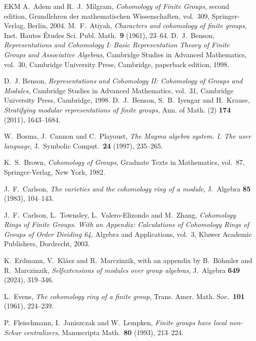 \documentclass[11pt,a4paper]{amsart}
\numberwithin{equation}{section}
\begin{document}
\begin{thebibliography}{EKM}
A.~Adem and R.~J.~Milgram,
{\emph{Cohomology of Finite Groups}},
second edition, Grundlehren der mathematischen Wissenschaften,
vol.~309, Springer-Verlag, Berlin, 2004.
M.~F.~Atiyah,
{\emph{Characters and cohomology of finite groups}},
Inst. Hautes \'Etudes Sci. Publ. Math.\ \textbf{9} (1961), 23--64.
D.~J.~Benson,
\emph{Representations and Cohomology I: Basic Representation Theory
of Finite Groups and Associative Algebras},
Cambridge Studies in Advanced Mathematics, vol.~30,
Cambridge University Press, Cambridge, paperback edition, 1998.

D.~J. Benson,
\emph{Representations and Cohomology II: Cohomology of Groups and Modules},
Cambridge Studies in Advanced Mathematics, vol.~31,
Cambridge University Press, Cambridge, 1998.
D.~J.~Benson, S.~B.~Iyengar and H.~Krause,
{\emph{Stratifying modular representations of finite groups}},
Ann. of Math. (2) \textbf{174} (2011), 1643--1684.

W.~Bosma, J.~Cannon and C.~Playoust,
\emph{The Magma algebra system. I. The user language},
J.~Symbolic Comput.\ \textbf{24} (1997), 235--265.

K.~S.~Brown,
{\emph{Cohomology of Groups}},
Graduate Texts in Mathematics, vol.~87,
Springer-Verlag, New York, 1982.

J.~F.~Carlson,
{\emph{The varieties and the cohomology ring of a module}},
J.~Algebra \textbf{85} (1983), 104--143.

J.~F.~Carlson, L.~Townsley, L.~Valero-Elizondo and M.~Zhang,
\emph{Cohomology Rings of Finite Groups.
With an Appendix: Calculations of Cohomology Rings of Groups
of Order Dividing 64},
Algebra and Applications, vol.~3,
Kluwer Academic Publishers, Dordrecht, 2003.

K.~Erdmann, V.~Kl\'asz and R.~Marczinzik,
with an appendix by B.~B\"ohmler and R.~Marczinzik,
\emph{Selfextensions of modules over group algebras},
J.~Algebra \textbf{649} (2024), 319--346.

L.~Evens,
{\emph{The cohomology ring of a finite group}},
Trans. Amer. Math. Soc.\ \textbf{101} (1961), 224--239.


P.~Fleischmann, I.~Janiszczak and W.~Lempken,
\emph{Finite groups have local non-Schur centralizers},
Manuscripta Math.\ \textbf{80} (1993), 213--224.


\end{thebibliography}
\end{document}
